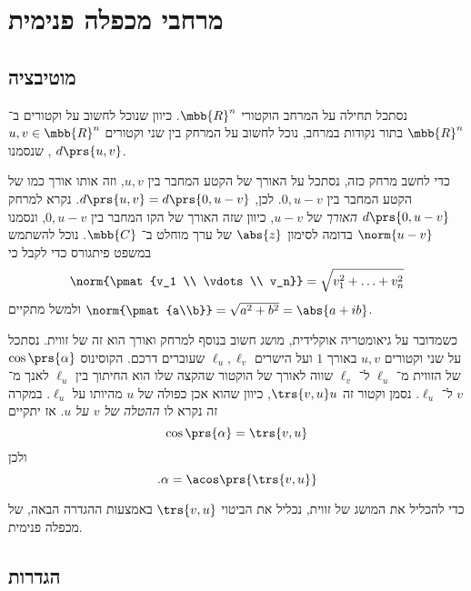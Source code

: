 \documentclass[a4paper,10pt,twoside,openany]{book}
\begin{document}
\chapter{מרחבי מכפלה פנימית}

\section{מוטיבציה}

נסתכל תחילה על המרחב הוקטורי
$\mbb{R}^n$.
כיוון שנוכל לחשוב על וקטורים ב־%
$\mbb{R}^n$
בתור נקודות במרחב, נוכל לחשוב על המרחק בין שני וקטורים
$u,v \in \mbb{R}^n$,
שנסמנו
$d\prs{u,v}$.

כדי לחשב מרחק כזה, נסתכל על האורך של הקטע המחבר בין
$u,v$,
וזה אותו אורך כמו של הקטע המחבר בין
$0,u-v$.
לכן,
$d\prs{u,v} = d\prs{0,u-v}$.
נקרא למרחק
$d\prs{0,u-v}$
\emph{האורך}
של
$u-v$,
כיוון שזה האורך של הקו המחבר בין
$0,u-v$,
ונסמנו
$\norm{u-v}$
בדומה לסימון
$\abs{z}$
של ערך מוחלט ב־%
$\mbb{C}$.
נוכל להשתמש במשפט פיתגורס כדי לקבל כי
\[\norm{\pmat{v_1 \\ \vdots \\ v_n}} = \sqrt{v_1^2 + \ldots + v_n^2}\]
ולמשל מתקיים
$\norm{\pmat{a\\b}} = \sqrt{a^2 + b^2} = \abs{a + ib}$.

כשמדובר על גיאומטריה אוקלידית, מושג חשוב בנוסף למרחק ואורך הוא זה של זווית. נסתכל על שני וקטורים
$u,v$
באורך
$1$
ועל הישרים
$\ell_u, \ell_v$
שעוברים דרכם.
הקוסינוס
$\cos\prs{\alpha}$
של הזווית מ־%
$\ell_u$
ל־%
$\ell_v$
שווה לאורך של הוקטור שהקצה שלו הוא החיתוך בין
$\ell_u$
לאנך מ־%
$v$
ל־%
$\ell_u$.
נסמן וקטור זה
$\trs{v,u} u$,
כיוון שהוא אכן כפולה של
$u$
מהיותו על
$\ell_u$.
במקרה זה נקרא לו
\emph{ההטלה של
$v$
על
$u$}.
אז יתקיים
\[\cos\prs{\alpha} = \trs{v,u}\]
ולכן
\[\text{.} \alpha = \acos\prs{\trs{v,u}}\]

כדי להכליל את המושג של זווית, נכליל את הביטוי
$\trs{v,u}$
באמצעות ההגדרה הבאה, של מכפלה פנימית.

\section{הגדרות}
\end{document}

